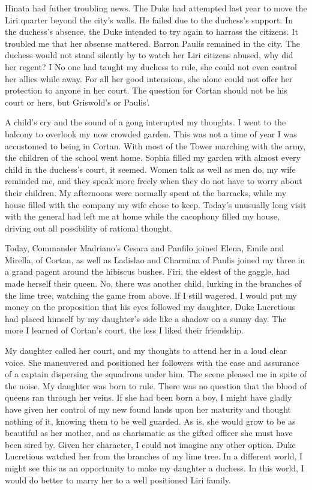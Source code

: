 \documentclass{article}
\begin{document}
Hinata had futher troubling news. The Duke had attempted last year to move the Liri quarter beyond the city's walls. He failed due to the duchess's support. In the duchess's absence, the Duke intended to try again to harrass the citizens. It troubled me that her absense mattered. Barron Paulis remained in the city. The duchess would not stand silently by to watch her Liri citizens abused, why did her regent? I No one had taught my duchess to rule, she could not even control her allies while away. For all her good intensions, she alone could not offer her protection to anyone in her court. The question for Cortan should not be his court or hers, but Griswold's or Paulis'.

A child's cry and the sound of a gong interupted my thoughts. I went to the balcony to overlook my now crowded garden. This was not a time of year I was accustomed to being in Cortan. With most of the Tower marching with the army, the children of the school went home. Sophia filled my garden with almost every child in the duchess's court, it seemed. Women talk as well as men do, my wife reminded me, and they speak more freely when they do not have to worry about their children. My afternoons were normally spent at the barracks, while my house filled with the company my wife chose to keep. Today's unusually long visit with the general had left me at home while the cacophony filled my house, driving out all possibility of rational thought.

Today, Commander Madriano's Cesara and Panfilo joined Elena, Emile and Mirella, of Cortan, as well as Ladislao and Charmina of Paulis joined my three in a grand pagent around the hibiscus bushes. Firi, the eldest of the gaggle, had made herself their queen. No, there was another child, lurking in the branches of the lime tree, watching the game from above. If I still wagered, I would put my money on the proposition that his eyes followed my daughter. Duke Lucretious had placed himself by my daughter's side like a shadow on a sunny day. The more I learned of Cortan's court, the less I liked their friendship. 

My daughter called her court, and my thoughts to attend her in a loud clear voice. She maneuvered and positioned her followers with the ease and assurance of a captain dispersing the squadrons under him. The scene pleased me in spite of the noise. My daughter was born to rule. There was no question that the blood of queens ran through her veins. If she had been born a boy, I might have gladly have given her control of my new found lands upon her maturity and thought nothing of it, knowing them to be well guarded. As is, she would grow to be as beautiful as her mother, and as charismatic as the gifted officer she must have been sired by. Given her character, I could not imagine any other option. Duke Lucretious watched her from the branches of my lime tree. In a different world, I might see this as an opportunity to make my daughter a duchess. In this world, I would do better to marry her to a well positioned Liri family. 
\end{document}
